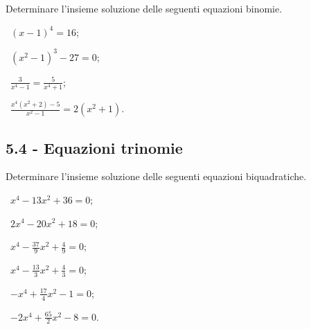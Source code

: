 \begin{esercizio}
\label{ese:5.20}
Determinare l'insieme soluzione delle seguenti equazioni binomie.
\begin{multicols}{2}
 \begin{enumeratea}
 \item~$(x-1)^4=16$;
 \item~$(x^2-1)^3-27=0$;
 \item~$ \frac 3{x^4-1}=\frac 5{x^4+1} $;
 \item~$ \frac{x^4(x^2+2)-5}{x^2-1}=2(x^2+1) $.
 \end{enumeratea}
 \end{multicols}
\end{esercizio}

\subsection*{5.4 - Equazioni trinomie}

\begin{esercizio}[\Ast]
\label{ese:5.21}
Determinare l'insieme soluzione delle seguenti equazioni biquadratiche.
\begin{multicols}{3}
 \begin{enumeratea}
 \item~$x^4-13x^2+36=0$;
 \item~$2x^4-20x^2+18=0$;
 \item~$x^4-\frac{37} 9x^2+\frac 4 9=0$;
 \item~$x^4-\frac{13} 3x^2+\frac 4 3=0$;
 \item~$-x^4+\frac{17} 4x^2-1=0$;
 \item~$-2x^4+\frac{65} 2x^2-8=0$.
 \end{enumeratea}
\end{multicols}
\end{esercizio}

